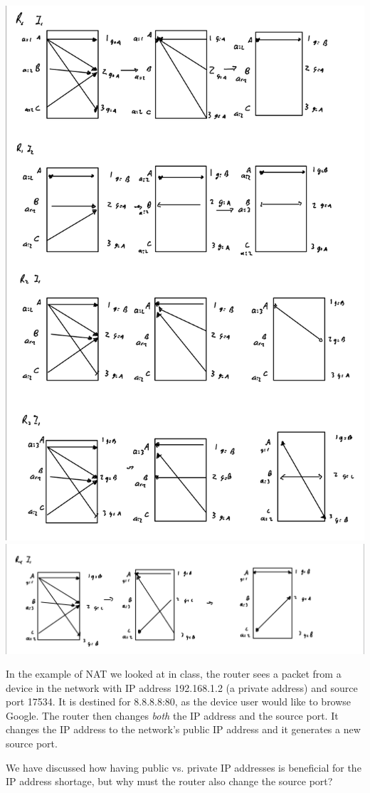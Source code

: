 \documentclass[10pt]{article}
\newenvironment{problem}[2][Problem]{\begin{trivlist}
\item[\hskip \labelsep {\bfseries #1}\hskip \labelsep {\bfseries #2.}]}{\end{trivlist}}
\begin{document}
\begin{enumerate}
\begin{center}
        \includegraphics[scale = 0.35]{hw7pr1b1.jpeg}
        \includegraphics[scale = 0.3]{hw7pr1b2.jpeg}
    \end{center}
\end{enumerate}


\begin{problem}{2: Network Address Translation}
In the example of NAT we looked at in class, the router sees a packet from a device in the network with IP address 192.168.1.2 (a private address) and source port 17534. It is destined for 8.8.8.8:80, as the device user would like to browse Google. The router then changes \emph{both} the IP address and the source port. It changes the IP address to the network's public IP address and it generates a new source port. 

We have discussed how having public vs. private IP addresses is beneficial for the IP address shortage, but why must the router also change the source port?
\end{problem}
\end{document}

